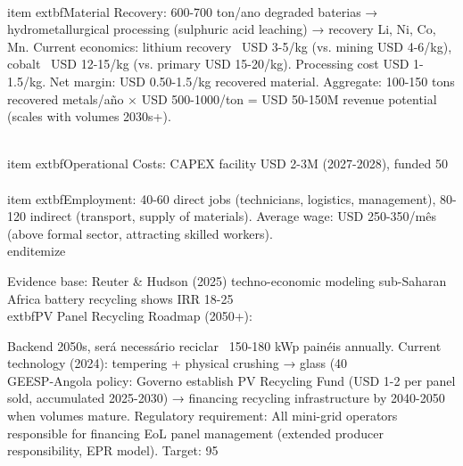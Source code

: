 \documentclass[12pt, a4paper]{article}
\begin{document}
{{{{{{{{{{{{\\item 	extbf{Material Recovery}: 600-700 ton/ano degraded baterias → hydrometallurgical processing (sulphuric acid leaching) → recovery Li, Ni, Co, Mn. Current economics: lithium recovery ~USD 3-5/kg (vs. mining USD 4-6/kg), cobalt ~USD 12-15/kg (vs. primary USD 15-20/kg). Processing cost USD 1-1.5/kg. Net margin: USD 0.50-1.5/kg recovered material. Aggregate: 100-150 tons recovered metals/año × USD 500-1000/ton = USD 50-150M revenue potential (scales with volumes 2030s+).

\\item 	extbf{Operational Costs}: CAPEX facility USD 2-3M (2027-2028), funded 50\\%

\\item 	extbf{Employment}: 40-60 direct jobs (technicians, logistics, management), 80-120 indirect (transport, supply of materials). Average wage: USD 250-350/mês (above formal sector, attracting skilled workers).
\\end{itemize}

Evidence base: Reuter & Hudson (2025) techno-economic modeling sub-Saharan Africa battery recycling shows IRR 18-25\\%

	extbf{PV Panel Recycling Roadmap (2050+):}

Backend 2050s, será necessário reciclar ~150-180 kWp painéis annually. Current technology (2024): tempering + physical crushing → glass (40\\%

GEESP-Angola policy: Governo establish PV Recycling Fund (USD 1-2 per panel sold, accumulated 2025-2030) → financing recycling infrastructure by 2040-2050 when volumes mature. Regulatory requirement: All mini-grid operators responsible for financing EoL panel management (extended producer responsibility, EPR model). Target: 95\\%

}}}}}}}}}}}}
\end{document}
